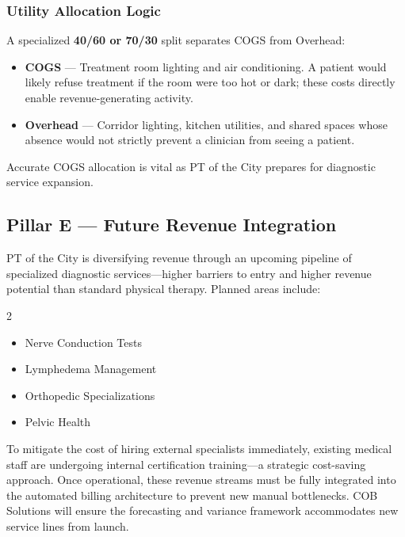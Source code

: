 \documentclass[11pt,a4paper]{article}
\begin{document}
\subsubsection{Utility Allocation Logic}

A specialized \textbf{40/60 or 70/30} split separates COGS from Overhead:

\begin{itemize}
  \item \textbf{COGS} --- Treatment room lighting and air conditioning. A patient would
        likely refuse treatment if the room were too hot or dark; these costs directly
        enable revenue-generating activity.
  \item \textbf{Overhead} --- Corridor lighting, kitchen utilities, and shared spaces whose
        absence would not strictly prevent a clinician from seeing a patient.
\end{itemize}

Accurate COGS allocation is vital as PT of the City prepares for diagnostic service expansion.


\subsection{Pillar E --- Future Revenue Integration}

PT of the City is diversifying revenue through an upcoming pipeline of specialized
diagnostic services---higher barriers to entry and higher revenue potential than standard
physical therapy. Planned areas include:

\begin{multicols}{2}
\begin{itemize}
  \item Nerve Conduction Tests
  \item Lymphedema Management
  \item Orthopedic Specializations
  \item Pelvic Health
\end{itemize}
\end{multicols}

To mitigate the cost of hiring external specialists immediately, existing medical staff
are undergoing internal certification training---a strategic cost-saving approach. Once
operational, these revenue streams must be fully integrated into the automated billing
architecture to prevent new manual bottlenecks. COB Solutions will ensure the forecasting
and variance framework accommodates new service lines from launch.
\end{document}
